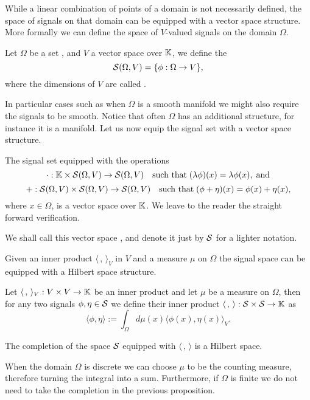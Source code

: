 \documentclass[../3.tex]{subfiles}
\begin{document}
    While a linear combination of points of a domain is not necessarily defined, the space of signals on that domain can be equipped with a vector space
    structure. More formally we can define the space of $V$-valued signals on the domain $\Omega$.

    \begin{defn}
        Let $\Omega$ be a set
        , and $V$ a vector space over $\mathbb{K}$, we define the 
        \[ \mathcal{S}(\Omega,V) = \{ \phi : \Omega \to V \}, \]
        where the dimensions of $V$ are called .
    \end{defn}

    In particular cases such as when $\Omega$ is a smooth manifold we might also require the signals to be smooth.
    Notice that often $\Omega$ has an additional structure, for instance it is a manifold.
    Let us now equip the signal set with a vector space structure.

    The signal set equipped with the operations
    \[ \cdot : \mathbb{K} \times \mathcal{S}(\Omega,V) \to \mathcal{S}(\Omega,V)   \quad \text{such that} \; (\lambda \phi)(x) = \lambda \phi(x), \; \text{and} \]
    \[ + : \mathcal{S}(\Omega,V) \times \mathcal{S}(\Omega,V) \to \mathcal{S}(\Omega,V) \quad \text{such that} \; (\phi + \eta)(x) = \phi(x) + \eta(x), \]
    where $x \in \Omega$, is a vector space over $\mathbb{K}$. We leave to the reader the straight forward verification.


    We shall call this vector space , and denote it just by $\mathcal{S}$ for
    a lighter notation.

    Given an inner product $\langle \, , \, \rangle_V$ in $V$ and a measure $\mu$ on $\Omega$ the signal space can be equipped with a Hilbert space structure.

    \begin{defn}
        Let $\langle \, , \, \rangle_V : V \times V \to \mathbb{K}$ be an inner product and let $\mu$ be a measure on $\Omega$, then for any two signals
        $\phi, \eta \in \mathcal{S}$ we define their inner product $\langle \, , \, \rangle : \mathcal{S} \times \mathcal{S} \to \mathbb{K}$ as
        \[ \langle \phi, \eta \rangle := \int_\Omega d\mu(x) \langle \phi(x), \eta(x) \rangle_V .\]
    \end{defn}

    \begin{prop}
        The completion of the space $\mathcal{S}$ equipped with $\langle \, , \, \rangle$ is a Hilbert space.
    \end{prop}

    \begin{rem}
        When the domain $\Omega$ is discrete we can choose $\mu$ to be the counting measure, therefore turning the integral into a sum.
        Furthermore, if $\Omega$ is finite we do not need to take the completion in the previous proposition.
    \end{rem}
\end{document}
